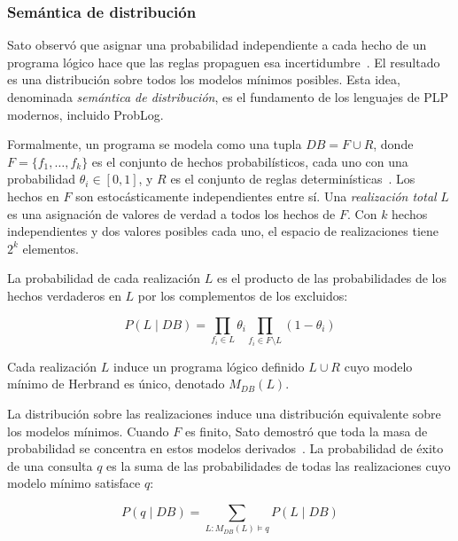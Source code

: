 \subsubsection{Semántica de distribución}

Sato observó que asignar una probabilidad independiente a cada hecho de un programa lógico hace que las reglas propaguen esa incertidumbre~\cite{sato1995statistical}. El resultado es una distribución sobre todos los modelos mínimos posibles. Esta idea, denominada \textit{semántica de distribución}, es el fundamento de los lenguajes de PLP modernos, incluido ProbLog.

Formalmente, un programa se modela como una tupla \( DB = F \cup R \), donde \( F = \{f_1, \ldots, f_k\} \) es el conjunto de hechos probabilísticos, cada uno con una probabilidad \( \theta_i \in [0,1] \), y \( R \) es el conjunto de reglas determinísticas~\cite{sato1995statistical}. Los hechos en \( F \) son estocásticamente independientes entre sí. Una \textit{realización total} \( L \) es una asignación de valores de verdad a todos los hechos de \( F \). Con \( k \) hechos independientes y dos valores posibles cada uno, el espacio de realizaciones tiene \( 2^k \) elementos.

La probabilidad de cada realización \( L \) es el producto de las probabilidades de los hechos verdaderos en \( L \) por los complementos de los excluidos:

\begin{equation}
    P(L \mid DB) = \prod_{f_i \in L} \theta_i \prod_{f_i \in F \setminus L} (1 - \theta_i)
    \label{eq:total-choice}
\end{equation}

Cada realización \( L \) induce un programa lógico definido \( L \cup R \) cuyo modelo mínimo de Herbrand es único, denotado \( M_{DB}(L) \).

La distribución sobre las realizaciones induce una distribución equivalente sobre los modelos mínimos. Cuando \( F \) es finito, Sato demostró que toda la masa de probabilidad se concentra en estos modelos derivados~\cite{sato1995statistical}. La probabilidad de éxito de una consulta \( q \) es la suma de las probabilidades de todas las realizaciones cuyo modelo mínimo satisface \( q \):

\begin{equation}
    P(q \mid DB) = \sum_{L : M_{DB}(L) \models q} P(L \mid DB)
    \label{eq:success-probability}
\end{equation}

